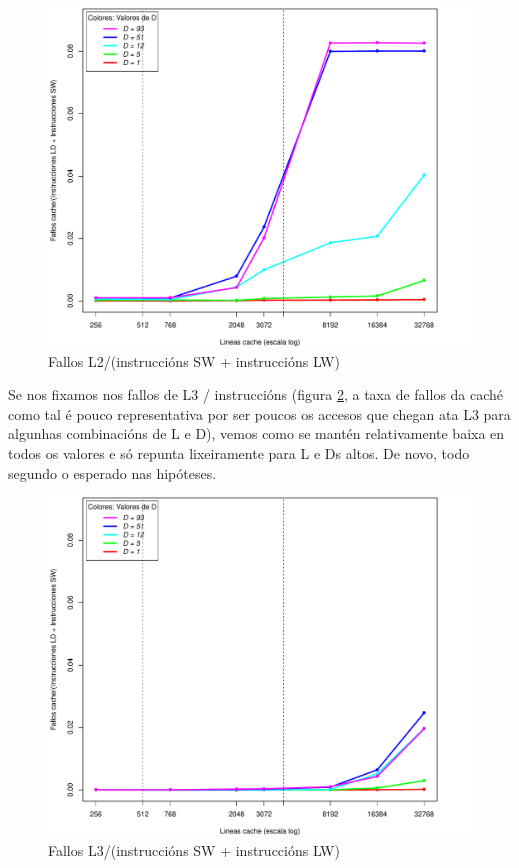\documentclass[letterpaper, 10 pt,spanish, conference]{ieeeconf}  %
\begin{document}
\begin{figure}
    \centering
    \includegraphics[scale=0.38]{L2M-T.pdf}
    \caption{Fallos L2/(instruccións SW + instruccións LW)}
    \label{fig:papil2t}
\end{figure}

Se nos fixamos nos fallos de L3 / instruccións (figura \ref{fig:papil3}, a taxa de fallos da caché como tal é pouco representativa por ser poucos os accesos que chegan ata L3 para algunhas combinacións de L e D), vemos como se mantén relativamente baixa en todos os valores e só repunta lixeiramente para L e Ds altos. De novo, todo segundo o esperado nas hipóteses.

\begin{figure}
    \centering
    \includegraphics[scale=0.38]{L3M-T.pdf}
    \caption{Fallos L3/(instruccións SW + instruccións LW)}
    \label{fig:papil3}
\end{figure}
\end{document}
